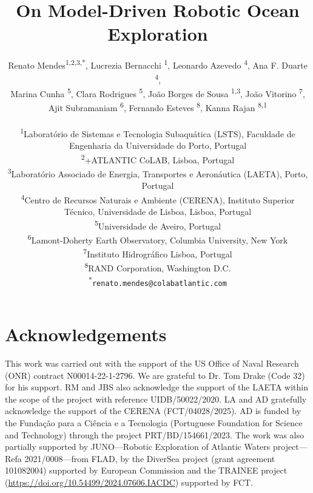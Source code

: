 \documentclass[11pt]{article}
\title{On Model-Driven Robotic Ocean Exploration}
\author{
Renato Mendes\textsuperscript{1,2,3,*},
Lucrezia Bernacchi \textsuperscript{1},
Leonardo Azevedo \textsuperscript{4},
Ana F. Duarte \textsuperscript{4},\\
Marina Cunha \textsuperscript{5},
Clara Rodrigues \textsuperscript{5},
Jo\~{a}o Borges de Sousa \textsuperscript{1,3},
Jo\~{a}o Vitorino \textsuperscript{7},\\
Ajit Subramaniam \textsuperscript{6},
Fernando Esteves \textsuperscript{8},
Kanna Rajan \textsuperscript{8,1}
\\
\\
\textsuperscript{1}{\scriptsize Laboratório de Sistemas e Tecnologia Subaquática (LSTS), Faculdade de Engenharia da Universidade do Porto, Portugal}\\
\textsuperscript{2}{\scriptsize +ATLANTIC CoLAB, Lisboa, Portugal}\\
\textsuperscript{3}{\scriptsize Laboratório Associado de Energia, Transportes e Aeronáutica (LAETA), Porto, Portugal}\\
\textsuperscript{4}{\scriptsize Centro de Recursos Naturais e Ambiente (CERENA), Instituto Superior T\'{e}cnico, Universidade de Lisboa, Lisboa, Portugal}\\
\textsuperscript{5}{\scriptsize Universidade de Aveiro, Portugal}\\
\textsuperscript{6}{\scriptsize Lamont-Doherty Earth Observatory, Columbia University, New York}\\
\textsuperscript{7}{\scriptsize Instituto Hidrogr{\'a}fico Lisboa, Portugal}\\
\textsuperscript{8}{\scriptsize RAND Corporation, Washington D.C.}\\
\textsuperscript{*}\texttt{{\scriptsize renato.mendes@colabatlantic.com}}
}
\date{}
\begin{document}
\maketitle







\section{Acknowledgements}

This work was carried out with the support of the US Office of Naval
Research (ONR) contract N00014-22-1-2796. We are grateful to Dr. Tom
Drake (Code 32) for his support. RM and JBS also acknowledge the
support of the LAETA within the scope of the project with reference
UIDB/50022/2020. LA and AD gratefully acknowledge the support of the
CERENA (FCT/04028/2025). AD is funded by the Funda\c{c}\~{a}o para a
Ci\^{e}ncia e a Tecnologia (Portuguese Foundation for Science and
Technology) through the project PRT/BD/154661/2023. The work was also
partially supported by JUNO—Robotic Exploration of Atlantic Waters
project—Refa 2021/0008—from FLAD, by the DiverSea project (grant
agreement 101082004) supported by European Commission and the TRAINEE
project (\url{https://doi.org/10.54499/2024.07606.IACDC}) supported by
FCT.


\footnotesize{
  
}
\end{document}
